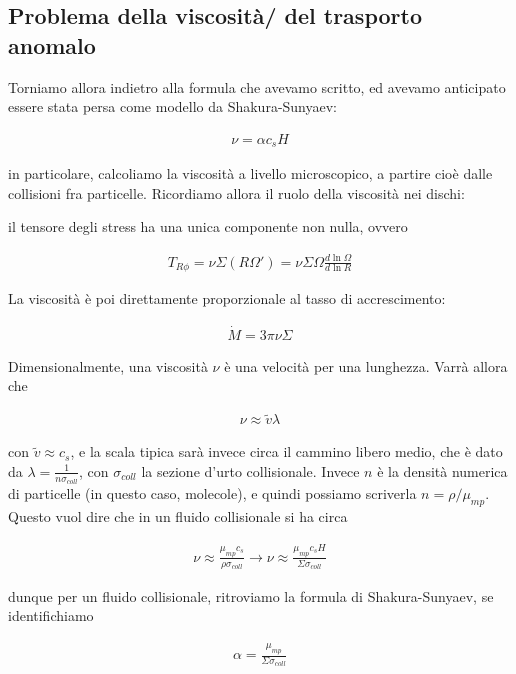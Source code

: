 \documentclass{report}
\begin{document}
\subsection{Problema della viscosità/ del trasporto anomalo}

Torniamo allora indietro alla formula che avevamo scritto, ed avevamo anticipato essere stata persa come modello da Shakura-Sunyaev: 

\begin{align}
    \nu = \alpha c_s H
\end{align}

in particolare, calcoliamo la viscosità a livello microscopico, a partire cioè dalle collisioni fra particelle. Ricordiamo allora il ruolo della viscosità nei dischi: 

il tensore degli stress ha una unica componente non nulla, ovvero 

\begin{align}
    T_{R \phi} = \nu\Sigma (R\Omega') = \nu \Sigma \Omega \frac{d\ln\Omega}{d\ln R}
\end{align}

La viscosità è poi direttamente proporzionale al tasso di accrescimento: 

\begin{align}
    \dot{M} = 3\pi \nu \Sigma
\end{align}

Dimensionalmente, una viscosità \(\nu\) è una velocità per una lunghezza. Varrà allora che 

\begin{align}
    \nu \approx \tilde{v}\lambda
\end{align}

con \(\tilde{v} \approx c_s\), e la scala tipica sarà invece circa il cammino libero medio, che è dato da \(\lambda = \frac{1}{n\sigma_{coll}}\), con \(\sigma_{coll}\) la sezione d'urto collisionale. Invece \(n\) è la densità numerica di particelle (in questo caso, molecole), e quindi possiamo scriverla \(n = \rho/\mu_{mp}\). Questo vuol dire che in un fluido collisionale si ha circa 

\begin{align}
    \nu \approx \frac{\mu_{mp}c_s}{\rho \sigma_{coll}} \rightarrow \nu \approx \frac{\mu_{mp}c_sH}{\Sigma \sigma_{coll}}
\end{align}

dunque per un fluido collisionale, ritroviamo la formula di Shakura-Sunyaev, se identifichiamo 

\begin{align}
    \alpha = \frac{\mu_{mp}}{\Sigma \sigma_{coll}}
\end{align}
\end{document}
